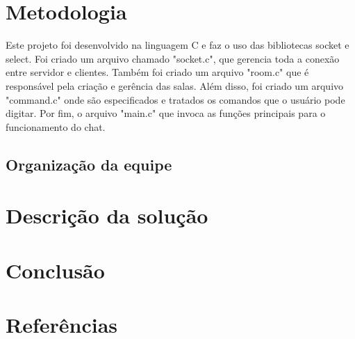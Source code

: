 \documentclass[a4paper]{article}
\begin{document}
\section{Metodologia}

Este projeto foi desenvolvido na linguagem C e faz o uso das bibliotecas socket e select. Foi criado um arquivo chamado "socket.c", que gerencia toda a conexão entre servidor e clientes. Também foi criado um arquivo "room.c" que é responsável pela criação e gerência das salas. Além disso, foi criado um arquivo "command.c" onde são especificados e tratados os comandos que o usuário pode digitar. Por fim, o arquivo "main.c" que invoca as funções principais para o funcionamento do chat.

\subsection{Organização da equipe}

\section{Descrição da solução}

\section{Conclusão}

\section{Referências}
\end{document}
